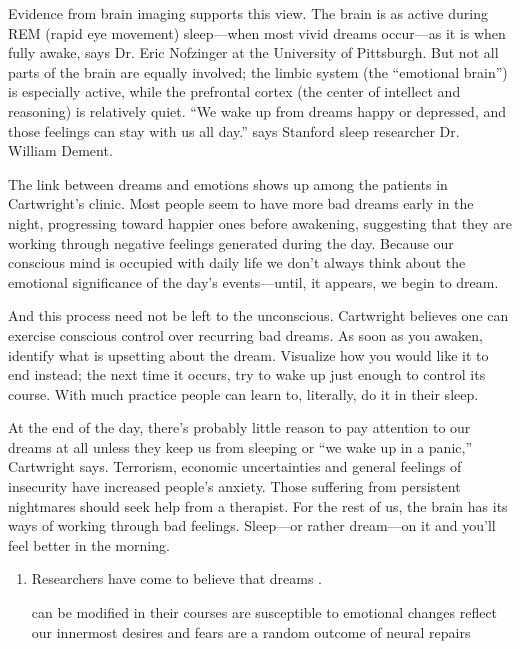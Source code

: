 {Evidence from brain imaging supports this view. The brain is as active
during REM (rapid eye movement) sleep---when most vivid dreams
occur---as it is when fully awake, says Dr. Eric Nofzinger at the
University of Pittsburgh. But not all parts of the brain are equally
involved; the limbic system (the ``emotional brain'') is especially
active, while the prefrontal cortex (the center of intellect and
reasoning) is relatively quiet. ``We wake up from dreams happy or
depressed, and those feelings can stay with us all day.'' says Stanford
sleep researcher Dr. William Dement.

The link between dreams and emotions shows up among the patients in
Cartwright's clinic. Most people seem to have more bad dreams early in
the night, progressing toward happier ones before awakening, suggesting
that they are working through negative feelings generated during the
day. Because our conscious mind is occupied with daily life we don't
always think about the emotional significance of the day's
events---until, it appears, we begin to dream.

And this process need not be left to the unconscious. Cartwright
believes one can exercise conscious control over recurring bad dreams.
As soon as you awaken, identify what is upsetting about the dream.
Visualize how you would like it to end instead; the next time it occurs,
try to wake up just enough to control its course. With much practice
people can learn to, literally, do it in their sleep.

At the end of the day, there's probably little reason to pay attention
to our dreams at all unless they keep us from sleeping or ``we wake up
in a panic,'' Cartwright says. Terrorism, economic uncertainties and
general feelings of insecurity have increased people's anxiety. Those
suffering from persistent nightmares should seek help from a therapist.
For the rest of us, the brain has its ways of working through bad
feelings. Sleep---or rather dream---on it and you'll feel better in the
morning.


\begin{enumerate}[resume]
	\item
Researchers have come to believe that dreams \lineread.


\fourchoices
{can be modified in their courses}
{are susceptible to emotional changes}
{reflect our innermost desires and fears}
{are a random outcome of neural repairs}



\end{enumerate}}
